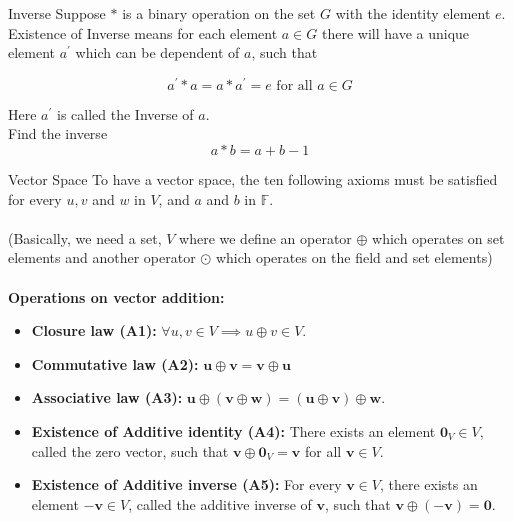 \documentclass[11pt]{beamer}
\theoremstyle{plain}
\begin{document}
\begin{frame}{Inverse}
Suppose $*$ is a binary operation on the set $G$ with the identity element $e$. Existence of Inverse means for each element $a \in G$ there will have a unique element $a^{\prime}$ which can be dependent of $a$, such that

$$
a^{\prime} * a=a * a^{\prime}=e \text { for all } a \in G
$$


Here $a^{\prime}$ is called the Inverse of $a$.\\

Find the inverse $$a*b=a+b-1$$
    
\end{frame}
\begin{frame}{Vector Space}
    To have a vector space, the ten following axioms must be satisfied for every $u, v$ and $w$ in $V$, and $a$ and $b$ in $\mathbb F$.\\~\\
(Basically, we need a set, $V$ where we define an operator $\oplus$ which operates on set elements and another operator $\odot$ which operates on the field and set elements)\\~\\
\textbf{Operations on vector addition:}
\begin{itemize}
    \item \textbf{Closure law (A1):} $\forall u,v\in V\implies u\oplus v\in V$. 
    \item \textbf{Commutative law (A2):} $\mathbf{u}\oplus\mathbf{v}=\mathbf{v}\oplus\mathbf{u}$ 
    \item \textbf{Associative law (A3):} $\mathbf{u}\oplus(\mathbf{v}\oplus\mathbf{w})=(\mathbf{u}\oplus\mathbf{v})\oplus\mathbf{w}$.
    \item \textbf{Existence of Additive identity (A4):} There exists an element $\mathbf{0}_V \in V$, called the zero vector, such that $\mathbf{v}\oplus\mathbf{0}_V=\mathbf{v}$ for all $\mathbf{v} \in V$.
    \item \textbf{Existence of Additive inverse (A5):} For every $\mathbf{v} \in V$, there exists an element $-\mathbf{v} \in V$, called the additive inverse of $\mathbf{v}$, such that $\mathbf{v}\oplus(-\mathbf{v})=\mathbf{0}$.
\end{itemize}
\end{frame}
\end{document}
